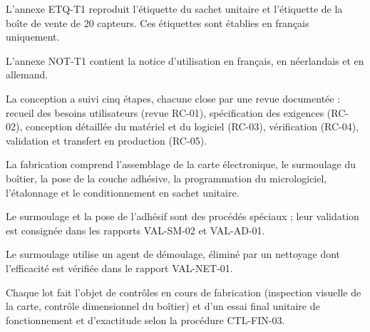 \documentclass[11pt,a4paper]{article}
\begin{document}
\begin{Form}
{\small L'annexe ETQ-T1 reproduit l'étiquette du sachet unitaire et l'étiquette de la boîte de vente de 20 capteurs. Ces étiquettes sont établies en français uniquement.}\par

{\small L'annexe NOT-T1 contient la notice d'utilisation en français, en néerlandais et en allemand.}\par

\par{}\par

\par{}\par

{\small La conception a suivi cinq étapes, chacune close par une revue documentée : recueil des besoins utilisateurs (revue RC-01), spécification des exigences (RC-02), conception détaillée du matériel et du logiciel (RC-03), vérification (RC-04), validation et transfert en production (RC-05).}\par

\par{}\par

{\small La fabrication comprend l'assemblage de la carte électronique, le surmoulage du boîtier, la pose de la couche adhésive, la programmation du micrologiciel, l'étalonnage et le conditionnement en sachet unitaire.}\par

{\small Le surmoulage et la pose de l'adhésif sont des procédés spéciaux ; leur validation est consignée dans les rapports VAL-SM-02 et VAL-AD-01.}\par

{\small Le surmoulage utilise un agent de démoulage, éliminé par un nettoyage dont l'efficacité est vérifiée dans le rapport VAL-NET-01.}\par

{\small Chaque lot fait l'objet de contrôles en cours de fabrication (inspection visuelle de la carte, contrôle dimensionnel du boîtier) et d'un essai final unitaire de fonctionnement et d'exactitude selon la procédure CTL-FIN-03.}\par

\par{}\par


\end{Form}
\end{document}
